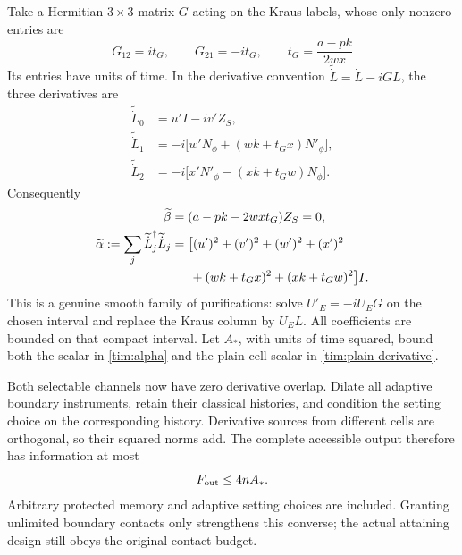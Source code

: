 \documentclass[11pt,a4paper]{article}
\numberwithin{equation}{section}
\theoremstyle{remark}
\begin{document}
Take a Hermitian $3\times3$ matrix $G$ acting on the Kraus labels, whose
only nonzero entries are
\begin{equation}
 G_{12}=it_G,\qquad G_{21}=-it_G,\qquad
 t_G=\frac{a-pk}{2wx}
 \label{tim:gauge}
\end{equation}
Its entries have units of time. In the derivative convention
$\widetilde{\dot L}=\dot L-iGL$, the three derivatives are
\begin{align}
 \widetilde{\dot L}_0&=u'I-iv'Z_S,\nonumber\\
 \widetilde{\dot L}_1&=-i\bigl[w'N_\phi+(wk+t_Gx)N'_\phi\bigr],\nonumber\\
 \widetilde{\dot L}_2&=-i\bigl[x'N'_\phi-(xk+t_Gw)N_\phi\bigr].
\end{align}
Consequently
\begin{align}
 \widetilde\beta&=(a-pk-2wxt_G)Z_S=0,\nonumber\\
 \widetilde\alpha
 :=\sum_j\widetilde{\dot L}_j^\dagger\widetilde{\dot L}_j
 &=\bigl[(u')^2+(v')^2+(w')^2+(x')^2\nonumber\\
 &\hspace{1.5em}+(wk+t_Gx)^2+(xk+t_Gw)^2\bigr]I.
 \label{tim:alpha}
\end{align}
This is a genuine smooth family of purifications: solve
$U'_E=-iU_EG$ on the chosen interval and replace the Kraus column by $U_EL$.
All coefficients are bounded on that compact interval. Let $A_*$, with
units of time squared, bound both the scalar in \eqref{tim:alpha} and the
plain-cell scalar in \eqref{tim:plain-derivative}.

Both selectable channels now have zero derivative overlap. Dilate all
adaptive boundary instruments, retain their classical histories, and
condition the setting choice on the corresponding history. Derivative
sources from different cells are orthogonal, so their squared norms add.
The complete accessible output therefore has information at most
\begin{equation}
 F_{\rm out}\le4nA_*.
\end{equation}
Arbitrary protected memory and adaptive setting choices are included.
Granting unlimited boundary contacts only strengthens this converse; the
actual attaining design still obeys the original contact budget.
\end{document}
